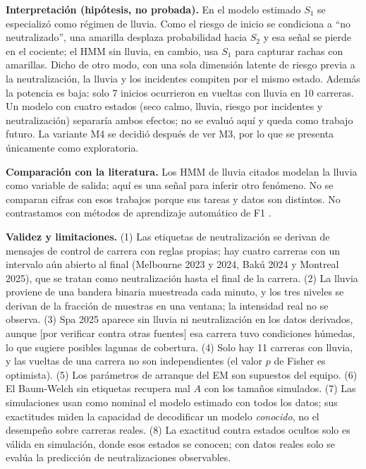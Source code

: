 \documentclass[11pt,letterpaper]{article}
\newcommand{\pend}[1]{\textcolor{red!70!black}{[#1]}}
\begin{document}
\textbf{Interpretación (hipótesis, no probada).} En el modelo estimado $S_1$ se especializó como régimen de lluvia. Como el riesgo de inicio se condiciona a ``no neutralizado'', una amarilla desplaza probabilidad hacia $S_2$ y esa señal se pierde en el cociente; el HMM sin lluvia, en cambio, usa $S_1$ para capturar rachas con amarillas. Dicho de otro modo, con una sola dimensión latente de riesgo previa a la neutralización, la lluvia y los incidentes compiten por el mismo estado. Además la potencia es baja: solo 7 inicios ocurrieron en vueltas con lluvia en 10 carreras. Un modelo con cuatro estados (seco calmo, lluvia, riesgo por incidentes y neutralización) separaría ambos efectos; no se evaluó aquí y queda como trabajo futuro. La variante M4 se decidió después de ver M3, por lo que se presenta únicamente como exploratoria.

\textbf{Comparación con la literatura.} Los HMM de lluvia citados \cite{r1,r2,r4,r7} modelan la lluvia como variable de salida; aquí es una señal para inferir otro fenómeno. No se comparan cifras con esos trabajos porque sus tareas y datos son distintos. No contrastamos con métodos de aprendizaje automático de F1 \cite{r10,r11,r12}.

\textbf{Validez y limitaciones.} (1) Las etiquetas de neutralización se derivan de mensajes de control de carrera con reglas propias; hay cuatro carreras con un intervalo aún abierto al final (Melbourne 2023 y 2024, Bakú 2024 y Montreal 2025), que se tratan como neutralización hasta el final de la carrera. (2) La lluvia proviene de una bandera binaria muestreada cada minuto, y los tres niveles se derivan de la fracción de muestras en una ventana; la intensidad real no se observa. (3) Spa 2025 aparece sin lluvia ni neutralización en los datos derivados, aunque \pend{por verificar contra otras fuentes} esa carrera tuvo condiciones húmedas, lo que sugiere posibles lagunas de cobertura. (4) Solo hay 11 carreras con lluvia, y las vueltas de una carrera no son independientes (el valor $p$ de Fisher es optimista). (5) Los parámetros de arranque del EM son supuestos del equipo. (6) El Baum-Welch sin etiquetas recupera mal $A$ con los tamaños simulados. (7) Las simulaciones usan como nominal el modelo estimado con todos los datos; sus exactitudes miden la capacidad de decodificar un modelo \emph{conocido}, no el desempeño sobre carreras reales. (8) La exactitud contra estados ocultos solo es válida en simulación, donde esos estados se conocen; con datos reales solo se evalúa la predicción de neutralizaciones observables.
\end{document}
